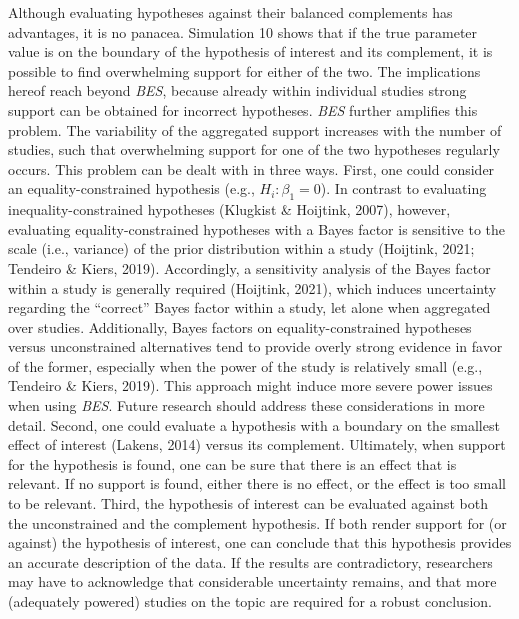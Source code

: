 \documentclass[
]{interact}
\begin{document}
                    Although evaluating hypotheses against their balanced complements has
                    advantages, it is no panacea. Simulation 10 shows that if the true
                    parameter value is on the boundary of the hypothesis of interest and its
                    complement, it is possible to find overwhelming support for either of
                    the two. The implications hereof reach beyond \emph{BES}, because
                    already within individual studies strong support can be obtained for
                    incorrect hypotheses. \emph{BES} further amplifies this problem. The
                    variability of the aggregated support increases with the number of
                    studies, such that overwhelming support for one of the two hypotheses
                    regularly occurs. This problem can be dealt with in three ways. First,
                    one could consider an equality-constrained hypothesis (e.g.,
                                                                           \(H_i: \beta_1=0\)). In contrast to evaluating inequality-constrained
                    hypotheses (Klugkist \& Hoijtink, 2007), however, evaluating
                    equality-constrained hypotheses with a Bayes factor is sensitive to the
                    scale (i.e., variance) of the prior distribution within a study
                    (Hoijtink, 2021; Tendeiro \& Kiers, 2019). Accordingly, a sensitivity
                    analysis of the Bayes factor within a study is generally required
                    (Hoijtink, 2021), which induces uncertainty regarding the ``correct''
                    Bayes factor within a study, let alone when aggregated over studies.
                    Additionally, Bayes factors on equality-constrained hypotheses versus
                    unconstrained alternatives tend to provide overly strong evidence in
                    favor of the former, especially when the power of the study is
                    relatively small (e.g., Tendeiro \& Kiers, 2019). This approach might
                    induce more severe power issues when using \emph{BES}. Future research
                    should address these considerations in more detail. Second, one could
                    evaluate a hypothesis with a boundary on the smallest effect of interest
                    (Lakens, 2014) versus its complement. Ultimately, when support for the
                    hypothesis is found, one can be sure that there is an effect that is
                    relevant. If no support is found, either there is no effect, or the
                    effect is too small to be relevant. Third, the hypothesis of interest
                    can be evaluated against both the unconstrained and the complement
                    hypothesis. If both render support for (or against) the hypothesis of
                    interest, one can conclude that this hypothesis provides an accurate
                    description of the data. If the results are contradictory, researchers
                    may have to acknowledge that considerable uncertainty remains, and that
                    more (adequately powered) studies on the topic are required for a robust
                    conclusion.
                    
\end{document}
